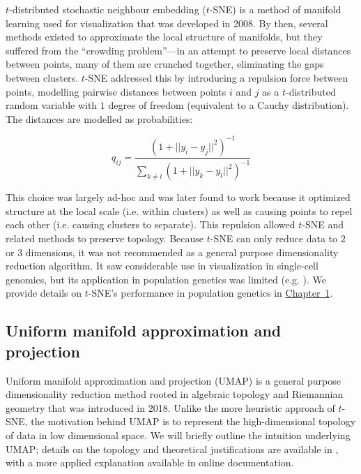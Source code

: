 $t$-distributed stochastic neighbour embedding ($t$-SNE) is a method of manifold learning used for visualization that was developed in 2008\citep{maaten_visualizing_2008}. By then, several methods existed to approximate the local structure of manifolds, but they suffered from the ``crowding problem''---in an attempt to preserve local distances between points, many of them are crunched together, eliminating the gaps between clusters. $t$-SNE addressed this by introducing a repulsion force between points, modelling pairwise distances between points $i$ and $j$ as a $t$-distributed random variable with $1$ degree of freedom (equivalent to a Cauchy distribution). The distances are modelled as probabilities:

$$q_{ij} = \frac{(1 + ||y_{i} - y_{j}||^{2})^{-1}}{\sum_{k \neq l}(1 + ||y_{k} - y_{l}||^{2})^{-1}}$$

This choice was largely ad-hoc and was later found to work because it optimized structure at the local scale (i.e. within clusters) as well as causing points to repel each other (i.e. causing clusters to separate)\citep{carreira-perpinan_elastic_2010}. This repulsion allowed $t$-SNE and related methods to preserve topology\citep{wasserman_topological_2018}. Because $t$-SNE can only reduce data to $2$ or $3$ dimensions, it was not recommended as a general purpose dimensionality reduction algorithm\citep{maaten_visualizing_2008}. It saw considerable use in visualization in single-cell genomics\citep{kobak_art_2019}, but its application in population genetics was limited (e.g. \citep{li_application_2017}). We provide details on $t$-SNE's performance in population genetics in \hyperref[chap:chapter1]{Chapter~1}.

\subsection{Uniform manifold approximation and projection}

Uniform manifold approximation and projection (UMAP) is a general purpose dimensionality reduction method rooted in algebraic topology and Riemannian geometry that was introduced in 2018\citep{mcinnes_umap_2020}. Unlike the more heuristic approach of $t$-SNE, the motivation behind UMAP is to represent the high-dimensional topology of data in low dimensional space. We will briefly outline the intuition underlying UMAP; details on the topology and theoretical justifications are available in \citep{mcinnes_umap_2020}, with a more applied explanation available in online documentation\citep{mcinnes_umapdoc_2018}.


